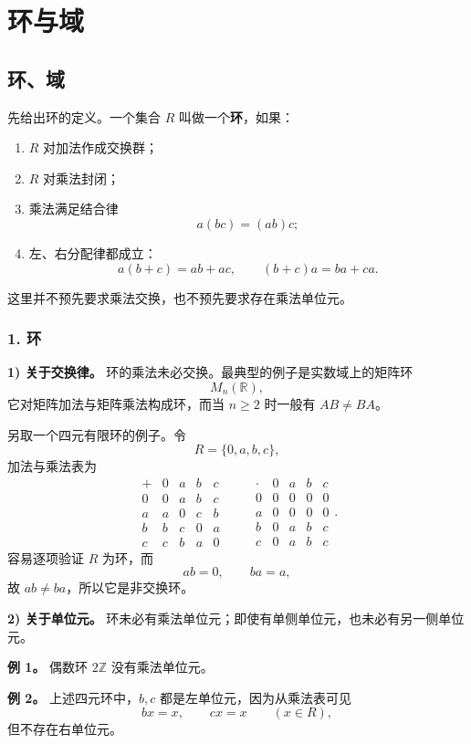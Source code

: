 \chapter{环与域}

\section{环、域}

先给出环的定义。一个集合 $R$ 叫做一个\textbf{环}，如果：
\begin{enumerate}[label=\roman*),leftmargin=3em]
\item $R$ 对加法作成交换群；
\item $R$ 对乘法封闭；
\item 乘法满足结合律
\[
a(bc)=(ab)c;
\]
\item 左、右分配律都成立：
\[
a(b+c)=ab+ac,\qquad (b+c)a=ba+ca.
\]
\end{enumerate}
这里并不预先要求乘法交换，也不预先要求存在乘法单位元。

\subsection*{1. 环}

\textbf{1) 关于交换律。} 环的乘法未必交换。最典型的例子是实数域上的矩阵环
\[
M_n(\mathbb R),
\]
它对矩阵加法与矩阵乘法构成环，而当 $n\ge2$ 时一般有 $AB\ne BA$。

另取一个四元有限环的例子。令
\[
R=\{0,a,b,c\},
\]
加法与乘法表为
\[
\begin{array}{c|cccc}
+&0&a&b&c\\\hline
0&0&a&b&c\\
a&a&0&c&b\\
b&b&c&0&a\\
c&c&b&a&0
\end{array}
\qquad
\begin{array}{c|cccc}
\cdot&0&a&b&c\\\hline
0&0&0&0&0\\
a&0&0&0&0\\
b&0&a&b&c\\
c&0&a&b&c
\end{array}.
\]
容易逐项验证 $R$ 为环，而
\[
ab=0,\qquad ba=a,
\]
故 $ab\ne ba$，所以它是非交换环。

\textbf{2) 关于单位元。} 环未必有乘法单位元；即使有单侧单位元，也未必有另一侧单位元。

\textbf{例 1。} 偶数环 $2\mathbb Z$ 没有乘法单位元。

\textbf{例 2。} 上述四元环中，$b,c$ 都是左单位元，因为从乘法表可见
\[
bx=x,\qquad cx=x\qquad(x\in R),
\]
但不存在右单位元。

